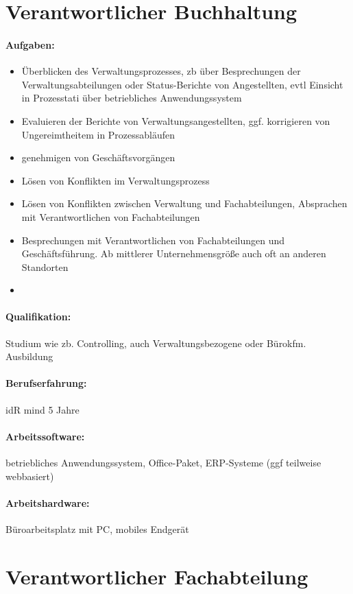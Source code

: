 \documentclass[11pt,oneside,a4paper,notitlepage]{article}
\begin{document}
%
%
\section{Verantwortlicher Buchhaltung}

\paragraph*{Aufgaben: }
\begin{itemize}
\item Überblicken des Verwaltungsprozesses, zb über Besprechungen der Verwaltungsabteilungen oder Status-Berichte von Angestellten, evtl Einsicht in Prozesstati über betriebliches Anwendungssystem
\item Evaluieren der Berichte von Verwaltungsangestellten, ggf. korrigieren von Ungereimtheitem in Prozessabläufen
\item genehmigen von Geschäftsvorgängen
\item Lösen von Konflikten im Verwaltungsprozess
\item Lösen von Konflikten zwischen Verwaltung und Fachabteilungen, Absprachen mit Verantwortlichen von Fachabteilungen
\item Besprechungen mit Verantwortlichen von Fachabteilungen und Geschäftsführung. Ab mittlerer Unternehmensgröße auch oft an anderen Standorten
\item 
\end{itemize}
\noindent
%
\paragraph*{Qualifikation: } Studium wie zb. Controlling, auch Verwaltungsbezogene oder Bürokfm. Ausbildung
%
\paragraph*{Berufserfahrung: } idR mind 5 Jahre
%
\paragraph*{Arbeitssoftware: } betriebliches Anwendungssystem, Office-Paket, ERP-Systeme (ggf teilweise webbasiert)
%
\paragraph*{Arbeitshardware: } Büroarbeitsplatz mit PC, mobiles Endgerät

%
%
\section{Verantwortlicher Fachabteilung}
\end{document}
